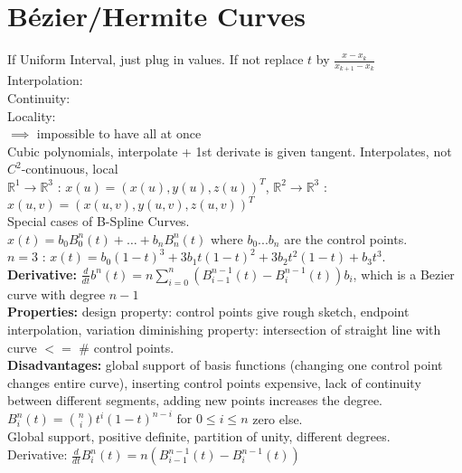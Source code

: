 \section{Bézier/Hermite Curves}
\BoxStart
{} If Uniform Interval, just plug in values. If not replace $t$ by $\frac{x - x_k}{x_{k + 1} - x_k}$
\BoxEnd
{} \\
Interpolation: \\
Continuity: \\
Locality:  \\
$\implies$ impossible to have all at once\\
Cubic polynomials, interpolate + 1st derivate is given tangent. Interpolates, not $C^2$-continuous, local\\
 $\mathbb{R}^1 \to \mathbb{R}^3$ : $x(u) = (x(u), y(u), z(u))^T$, $\mathbb{R}^2 \to \mathbb{R}^3$ : $x(u,v) = (x(u,v), y(u,v), z(u,v))^T$\\
Special cases of B-Spline Curves. \\
${x}(t) = b_0 B_0^n(t) + \dots + b_n B_n^n(t)$ where $b_0 ...b_n$ are the control points. 
\\
$n = 3 $ : ${x}(t) = b_0(1-t)^3 + 3b_1t(1-t)^2 + 3b_2t^2(1-t) + b_3t^3$. 
\\
\textbf{Derivative:} $\frac{d}{dt} b^n(t) = n \sum_{i=0}^{n} \left( B_{i-1}^{n-1}(t) - B_i^{n-1}(t) \right) b_i$, which is a Bezier curve with degree $n - 1$\\
\textbf{Properties:} design property: control points give rough sketch, endpoint interpolation, variation diminishing property: intersection of straight line with curve $<=$ \# control points.\\
\textbf{Disadvantages:} global support of basis functions (changing one control point changes entire curve), inserting control points expensive, lack of continuity between different segments, adding new points increases the degree.\\
$B_i^n(t) = \binom{n}{i} t^i (1 - t)^{n-i} \text{ for } 0 \leq i \leq n$ zero else. 
\\
Global support, positive definite, partition of unity, different degrees. 
\\
Derivative: $\frac{d}{dt} B_i^n(t) = n \left( B_{i-1}^{n-1}(t) - B_i^{n-1}(t) \right)$


